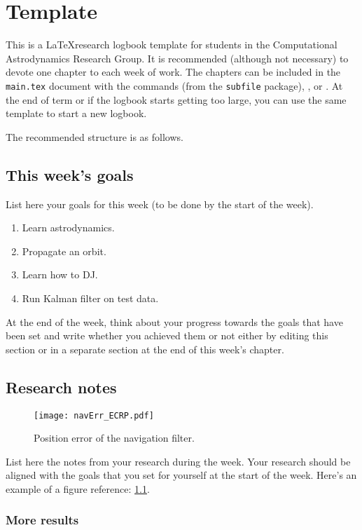 \documentclass[../main.tex]{subfiles}
\begin{document}
\chapter{Template}
This is a \LaTeX research logbook template for students in the Computational Astrodynamics Research Group.
It is recommended (although not necessary) to devote one chapter to each week of work.
The chapters can be included in the \texttt{main.tex} document with the commands \verb++ (from the \texttt{subfile} package), \verb++, or \verb++.
At the end of term or if the logbook starts getting too large, you can use the same template to start a new logbook.

The recommended structure is as follows.

\section{This week's goals}
List here your goals for this week (to be done by the start of the week).
\begin{enumerate}
    \item Learn astrodynamics.
    \item Propagate an orbit.
    \item Learn how to DJ.
    \item Run Kalman filter on test data.
\end{enumerate}

At the end of the week, think about your progress towards the goals that have been set and write whether you achieved them or not either by editing this section or in a separate section at the end of this week's chapter.

\section{Research notes}
\begin{figure}[tb]
    \centering
    \texttt{[image: navErr\_ECRP.pdf]}
    \caption{Position error of the navigation filter.\label{fig:err_pos}}
\end{figure}

List here the notes from your research during the week.
Your research should be aligned with the goals that you set for yourself at the start of the week.
Here's an example of a figure reference: \cref{fig:err_pos}.

    \subsection{More results}
        \lipsum[1-5]
\end{document}
